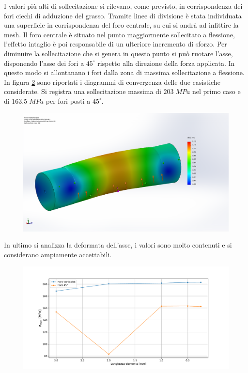 I valori più alti di sollecitazione si rilevano, come previsto, in corrispondenza dei fori ciechi di adduzione del grasso. Tramite linee di divisione è stata individuata una superficie in corrispondenza del foro centrale, su cui si andrà ad infittire la mesh. 
Il foro centrale è situato nel punto maggiormente sollecitato a flessione, l'effetto intaglio è  poi responsabile di un ulteriore incremento di sforzo. 
Per diminuire la sollecitazione che si genera in questo punto si può ruotare l'asse, disponendo l'asse dei fori a $45^{\circ}$ rispetto alla direzione della forza applicata. 
In questo modo si allontanano i fori dalla zona di massima sollecitazione a flessione. In figura \ref{fig:Asse} sono riportati i diagrammi di convergenza delle due casistiche considerate.
Si registra una sollecitazione massima di $203 \; MPa$ nel primo caso e di $163.5 \; MPa$ per fori posti a $45^{\circ}$.
\begin{figure}[H]
\centering
  \includegraphics[width=.65\textwidth]{imgs/fem/AsseDisp}
\caption{}
\label{fig:AsseDisp}
\end{figure}
In ultimo si analizza la deformata dell'asse, i valori sono molto contenuti e si considerano ampiamente accettabili. 
\begin{figure}[H]
\centering
  \includegraphics[width=.65\textwidth]{imgs/fem/Asse}
\caption{}
\label{fig:Asse}
\end{figure}